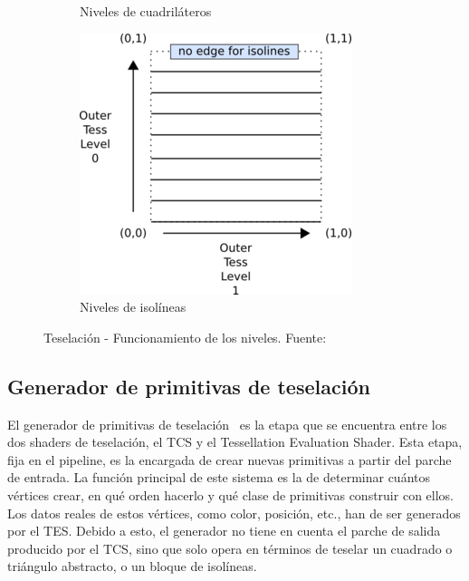 \begin{figure}[t]
\begin{subfigure}{.45\textwidth}
		\caption{Niveles de cuadriláteros}
		\label{fig:quadlevels}
	\end{subfigure}
	\par\bigskip \par\bigskip \par\bigskip
	\begin{subfigure}{.45\textwidth}
		\includegraphics[width=\textwidth]{figures/300px-Tessellation_isoline.png}	
		\caption{Niveles de isolíneas}
		\label{fig:isolevels}
	\end{subfigure}
	\caption[Teselación - Funcionamiento de los niveles.]{Teselación -
	Funcionamiento de los niveles. Fuente:~\cite{TessellationImages}}
	\label{fig:tesselationlevels}	
\end{figure}

\subsection{Generador de primitivas de teselación}
\label{ref:TesPriGen}

El generador de primitivas de teselación~\cite{TesPriGen} es la etapa que se
encuentra entre los dos shaders de teselación, el TCS y el Tessellation
Evaluation Shader. Esta etapa, fija en el pipeline, es la encargada de crear
nuevas primitivas a partir del parche de entrada. La función principal de este
sistema es la de determinar cuántos vértices crear, en qué orden hacerlo y qué
clase de primitivas construir con ellos. Los datos reales de estos vértices,
como color, posición, etc., han de ser generados por el TES. Debido a esto, el
generador no tiene en cuenta el parche de salida producido por el TCS, sino que
solo opera en términos de teselar un cuadrado o triángulo abstracto, o un bloque
de isolíneas.

